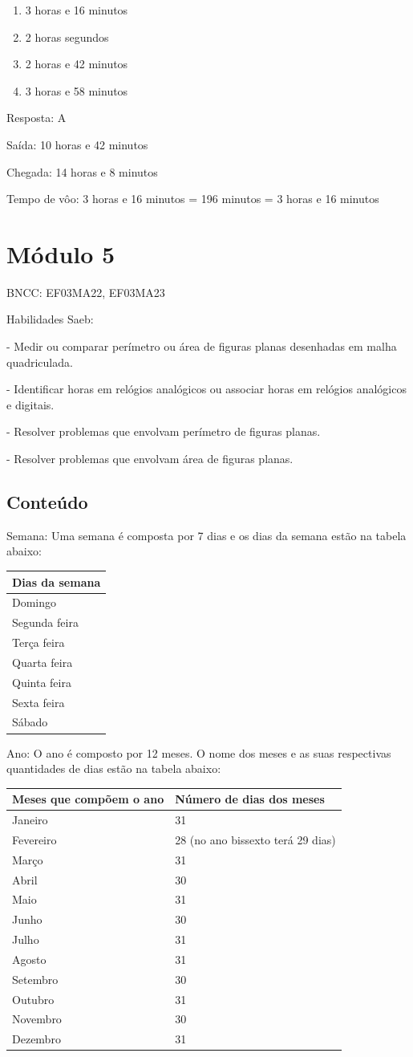\begin{enumerate}
\def\labelenumi{\alph{enumi})}
\item
  3 horas e 16 minutos
\item
  2 horas segundos
\item
  2 horas e 42 minutos
\item
  3 horas e 58 minutos
\end{enumerate}

Resposta: A

Saída: 10 horas e 42 minutos

Chegada: 14 horas e 8 minutos

Tempo de vôo: 3 horas e 16 minutos = 196 minutos = 3 horas e 16 minutos

\section{Módulo 5}\label{muxf3dulo-5}

BNCC: EF03MA22, EF03MA23

Habilidades Saeb:

- Medir ou comparar perímetro ou área de figuras planas desenhadas em
malha quadriculada.

- Identificar horas em relógios analógicos ou associar horas em relógios
analógicos e digitais.

- Resolver problemas que envolvam perímetro de figuras planas.

- Resolver problemas que envolvam área de figuras planas.

\subsection{Conteúdo}\label{conteuxfado-4}

Semana: Uma semana é composta por 7 dias e os dias da semana estão na
tabela abaixo:

\begin{longtable}[]{@{}l@{}}
\toprule
Dias da semana\tabularnewline
\midrule
\endhead
Domingo\tabularnewline
Segunda feira\tabularnewline
Terça feira\tabularnewline
Quarta feira\tabularnewline
Quinta feira\tabularnewline
Sexta feira\tabularnewline
Sábado\tabularnewline
\bottomrule
\end{longtable}

Ano: O ano é composto por 12 meses. O nome dos meses e as suas
respectivas quantidades de dias estão na tabela abaixo:

\begin{longtable}[]{@{}ll@{}}
\toprule
Meses que compõem o ano & Número de dias dos meses\tabularnewline
\midrule
\endhead
Janeiro & 31\tabularnewline
Fevereiro & 28 (no ano bissexto terá 29 dias)\tabularnewline
Março & 31\tabularnewline
Abril & 30\tabularnewline
Maio & 31\tabularnewline
Junho & 30\tabularnewline
Julho & 31\tabularnewline
Agosto & 31\tabularnewline
Setembro & 30\tabularnewline
Outubro & 31\tabularnewline
Novembro & 30\tabularnewline
Dezembro & 31\tabularnewline
\bottomrule
\end{longtable}

